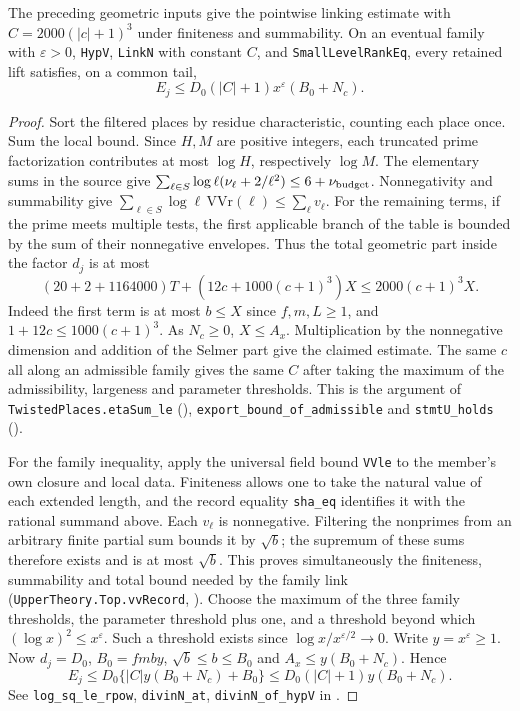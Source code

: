 \begin{proposition}
The preceding geometric inputs give the pointwise linking estimate with
$C=2000(|c|+1)^3$ under finiteness and summability. On an eventual
family with $\varepsilon>0$, \nolinkurl{HypV}, \nolinkurl{LinkN} with constant $C$,
and \nolinkurl{SmallLevelRankEq}, every retained lift satisfies, on a common tail,
\[
 E_j\le D_0 (|C|+1)x^\varepsilon(B_0+N_c).
\]
\end{proposition}
\begin{proof}
Sort the filtered places by residue characteristic, counting each place once.
Sum the local bound. Since $H,M$ are positive integers, each truncated
prime factorization contributes at most $\log H$, respectively $\log M$.
The elementary sums in the source give
$\sum_{\ell\in S}\log\ell(\nu_\ell+2/\ell^2)\le6+\nu_{\rm budget}$.
Nonnegativity and summability give
$\sum_{\ell\in S}\log\ell\,\mathrm{VVr}(\ell)\le\sum_\ell v_\ell$.
For the remaining terms, if the prime meets multiple tests, the first
applicable branch of the table is bounded by the sum of their nonnegative
envelopes. Thus the total geometric part inside the factor $d_j$ is at most
\[
 (20+2+1164000)T + (12c+1000(c+1)^3)X\le2000(c+1)^3X.
\]
Indeed the first term is at most $b\le X$ since $f,m,L\ge1$, and
$1+12c\le1000(c+1)^3$. As $N_c\ge0$, $X\le A_x$.
Multiplication by the nonnegative dimension and addition of the Selmer part
give the claimed estimate. The same $c$ all along an admissible family
gives the same $C$ after taking the maximum of the admissibility, largeness
and parameter thresholds. This is the argument of
\nolinkurl{TwistedPlaces.etaSum_le} (),
\nolinkurl{export_bound_of_admissible} and \nolinkurl{stmtU_holds}
().

For the family inequality, apply the universal field bound \nolinkurl{VVle}
to the member's own closure and local data. Finiteness allows one to take
the natural value of each extended length, and the record equality
\nolinkurl{sha_eq} identifies it with the rational summand above. Each
$v_\ell$ is nonnegative. Filtering the nonprimes from an arbitrary finite
partial sum bounds it by $\sqrt b$; the supremum of these sums therefore
exists and is at most $\sqrt b$. This proves simultaneously the finiteness,
summability and total bound needed by the family link
(\nolinkurl{UpperTheory.Top.vvRecord}, ).
Choose the maximum of the three family thresholds, the parameter threshold
plus one, and a threshold beyond which $(\log x)^2\le x^\varepsilon$.
Such a threshold exists since $\log x/x^{\varepsilon/2}\to0$.
Write $y=x^\varepsilon\ge1$. Now $d_j=D_0$, $B_0=fmby$,
$\sqrt b\le b\le B_0$ and $A_x\le y(B_0+N_c)$. Hence
\[
 E_j\le D_0\{ |C|y(B_0+N_c)+B_0\}
       \le D_0(|C|+1)y(B_0+N_c).
\]
See \nolinkurl{log_sq_le_rpow}, \nolinkurl{divinN_at},
\nolinkurl{divinN_of_hypV} in .
\end{proof}

